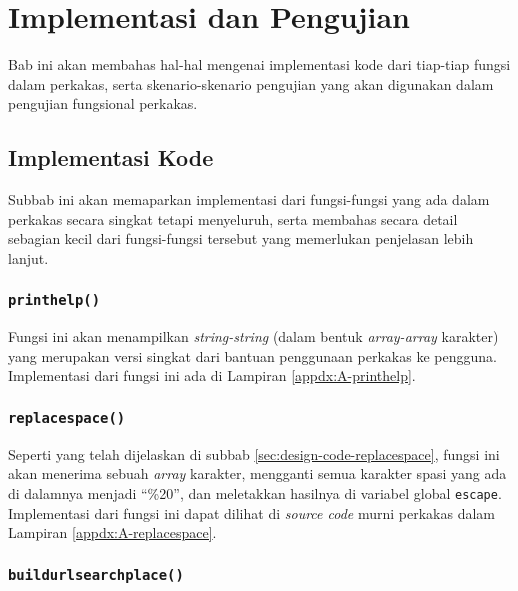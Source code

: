 \chapter{Implementasi dan Pengujian}
\label{chap:testing}

Bab ini akan membahas hal-hal mengenai implementasi kode dari tiap-tiap fungsi dalam perkakas, serta skenario-skenario pengujian yang akan digunakan dalam pengujian fungsional perkakas.

\section{Implementasi Kode}
\label{sec:testing-implementation}

Subbab ini akan memaparkan implementasi dari fungsi-fungsi yang ada dalam perkakas secara singkat tetapi menyeluruh, serta membahas secara detail sebagian kecil dari fungsi-fungsi tersebut yang memerlukan penjelasan lebih lanjut.

\subsection{\texttt{print\textunderscore help()}}
\label{sec:testing-implementation-printhelp}

Fungsi ini akan menampilkan \textit{string-string} (dalam bentuk \textit{array-array} karakter) yang merupakan versi singkat dari bantuan penggunaan perkakas ke pengguna. Implementasi dari fungsi ini ada di Lampiran \ref{appdx:A-printhelp}.

\subsection{\texttt{replace\textunderscore space()}}
\label{sec:testing-implementation-replacespace}

Seperti yang telah dijelaskan di subbab \ref{sec:design-code-replacespace}, fungsi ini akan menerima sebuah \textit{array} karakter, mengganti semua karakter spasi yang ada di dalamnya menjadi ``\%20'', dan meletakkan hasilnya di variabel global \verb|escape|. Implementasi dari fungsi ini dapat dilihat di \textit{source code} murni perkakas dalam Lampiran \ref{appdx:A-replacespace}.

\subsection{\texttt{build\textunderscore url\textunderscore searchplace()}}
\label{sec:testing-implementation-buildurl-searchplace}

